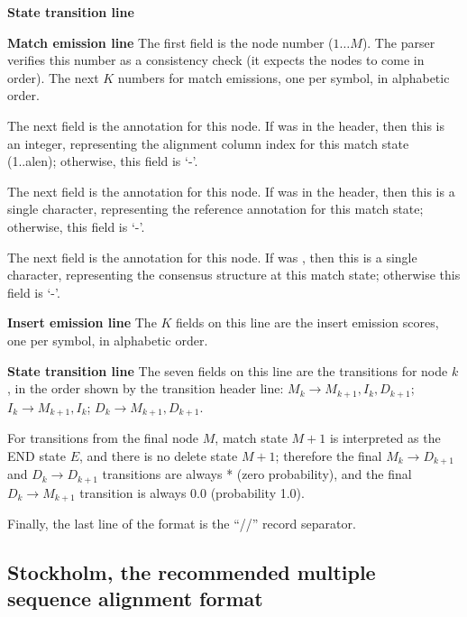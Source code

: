 \begin{sreitems}{\textbf{State transition line}}

\item [\textbf{Match emission line}] The first field is the node
number ($1 \ldots M$).  The parser verifies this number as a
consistency check (it expects the nodes to come in order). The next
$K$ numbers for match emissions, one per symbol, in alphabetic order.

The next field is the  annotation for this node.  If
 was  in the header, then this is an integer,
representing the alignment column index for this match state
(1..alen); otherwise, this field is `-'.

The next field is the  annotation for this node.  If
 was  in the header, then this is a single
character, representing the reference annotation for this match state;
otherwise, this field is `-'.

The next field is the  annotation for this node.  If
 was , then this is a single character,
representing the consensus structure at this match state; otherwise
this field is `-'.

\item [\textbf{Insert emission line}] The $K$ fields on this line are
the insert emission scores, one per symbol, in alphabetic order.

\item [\textbf{State transition line}] The seven fields on this line
are the transitions for node $k$, in the order shown by the transition
header line: $M_k \rightarrow M_{k+1}, I_{k}, D_{k+1}$; $ I_k
\rightarrow M_{k+1}, I_k$; $D_{k} \rightarrow M_{k+1}, D_{k+1}$.

For transitions from the final node $M$, match state $M+1$ is
interpreted as the END state $E$, and there is no delete state $M+1$;
therefore the final $M_k \rightarrow D_{k+1}$ and $D_k \rightarrow
D_{k+1}$ transitions are always * (zero probability), and the final
$D_k \rightarrow M_{k+1}$ transition is always 0.0 (probability 1.0).
\end{sreitems}

Finally, the last line of the format is the ``//'' record separator.

\subsection{Stockholm, the recommended multiple sequence alignment format}
\label{section:stockholm}

